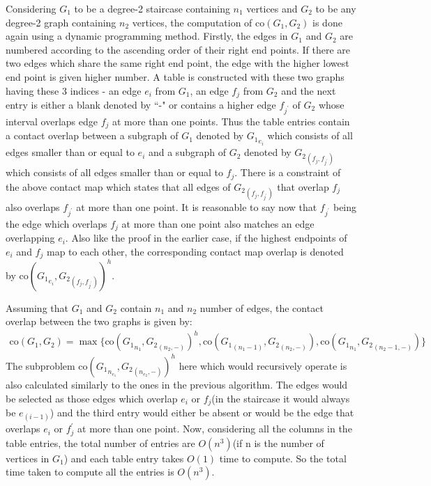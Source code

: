 Considering $G_1$ to be a degree-2 staircase containing $n_1$ vertices and $G_2$ to be any degree-2 graph containing $n_2$ vertices, the computation of $\text{co}(G_1,G_2)$ is done again using a dynamic programming method. Firstly, the edges in $G_1$ and $G_2$ are numbered according to the ascending order of their right end points. If there are two edges which share the same right end point, the edge with the higher lowest end point is given higher number. A table is constructed with these two graphs having these $3$ indices - an edge $e_i$ from $G_1$, an edge $f_j$ from $G_2$ and the next entry is either a blank denoted by ``-" or contains a higher edge $f_{j^\prime}$ of $G_2$ whose interval overlaps edge $f_j$ at more than one points. Thus the table entries contain a contact overlap between a subgraph of $G_1$ denoted by ${G_1}_{e_i}$ which consists of all edges smaller than or equal to $e_i$ and a subgraph of $G_2$ denoted by ${G_2}_{(f_j,{f_{j^\prime}})}$ which consists of all edges smaller than or equal to $f_j$. There is a constraint of the above contact map which states that all edges of ${G_2}_{(f_j,{f_{j^\prime}})}$ that overlap $f_j$ also overlaps $f_{j^\prime}$ at more than one point. It is reasonable to say now that $f_{j^\prime}$ being the edge which overlaps $f_j$ at more than one point also matches an edge overlapping $e_i$. Also like the proof in the earlier case, if the highest endpoints of $e_i$ and $f_j$ map to each other, the corresponding contact map overlap is denoted by $\text{co}({G_1}_{e_i}, {G_2}_{(f_j,{f_{j^\prime}})})^h$.

Assuming that $G_1$ and $G_2$ contain $n_1$ and $n_2$ number of edges, the contact overlap between the two graphs is given by:
\begin{eqnarray}
\label{sqs3}
\text{co}(G_1,G_2) = \max\{\text{co}({G_1}_{n_1}, {G_2}_{({n_2},-)})^h, \text{co}({G_1}_{({n_1}-1)}, {G_2}_{({n_2},-)}),\text{co}({G_1}_{n_1}, {G_2}_{({n_2}-1,-)})\}
\end{eqnarray}
The subproblem $\text{co}({G_1}_{n_{e_1}}, {G_2}_{({n_{e_2}},-)})^h$ here which would recursively operate is also calculated similarly to the ones in the previous algorithm. The edges would be selected as those edges which overlap $e_i$ or $f_j$(in the staircase it would always be $e_({i-1})$) and the third entry would either be absent or would be the edge that overlaps $e_i$ or $f_j^\prime$ at more than one point. Now, considering all the columns in the table entries, the total number of entries are $O(n^3)$(if n is the number of vertices in $G_1$) and each table entry takes $O(1)$ time to compute. So the total time taken to compute all the entries is $O(n^3)$.

